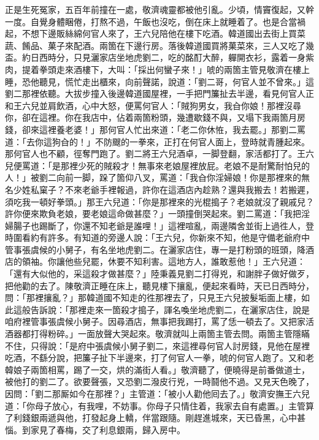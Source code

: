 正是生死冤家，五百年前撞在一處，敬濟魂靈都被他引亂。少頃，情竇復起，又幹一度。自覺身體睏倦，打熬不過，午飯也沒吃，倒在床上就睡着了。也是合當禍起，不想下邊販絲綿何官人來了，王六兒陪他在樓下吃酒。韓道國出去街上買菜蔬、餚品、菓子來配酒。兩箇在下邊行房。落後韓道國買將菓菜來，三人又吃了幾盃。約日西時分，只見灑家店坐地虎劉二，吃的酩酊大醉，軃開衣衫，露着一身紫肉，提着拳頭走來酒樓下，大叫：「採出何蠻子來！」唬的兩箇主管見敬濟在樓上睡，恐他聽見，慌忙走出櫃來，向前聲諾，說道：「劉二哥，何官人並不曾來。」這劉二那裡依聽。大拔步撞入後邊韓道國屋裡，一手把門簾扯去半邊，看見何官人正和王六兒並肩飲酒，心中大怒，便罵何官人：「賊狗男女，我㒲你娘！那裡沒尋你，卻在這裡。你在我店中，佔着兩箇粉頭，幾遭歇錢不與，又塌下我兩箇月房錢，卻來這裡養老婆！」{}那何官人忙出來道：「老二你休恠，我去罷。」那劉二罵道：「去你這狗㒲的！」不防颼的一拳來，正打在何官人面上，登時就青腫起來。那何官人也不顧，徑奪門跑了。劉二將王六兒酒卓，一脚登翻，家活都打了。王六兒便罵道：「是那裡少死的賊殺才！無事來老娘屋裡放屁。老娘不是耐驚耐怕兒的人！」{}被劉二向前一脚，跺了箇仰八叉，罵道：「我㒲你淫婦娘！你是那裡來的無名少姓私窠子？不來老爺手裡報過，許你在這酒店內趁熟？還與我搬去！若搬遲，須吃我一頓好拳頭。」那王六兒道：「你是那裡來的光棍搗子？老娘就沒了親戚兒？許你便來欺負老娘，要老娘這命做甚麼？」一頭撞倒哭起來。劉二罵道：「我把淫婦腸子也踢斷了，你還不知老爺是誰哩！」這裡喧亂，兩邊隣舍並街上過徃人，登時圍看約有許多。有知道的旁邊人說：「王六兒，你新來不知，他是守備老爺府中管事張虞候的小舅子，有名坐地虎劉二。在灑家店住，專一是打粉頭的班頭，降酒店的領袖。你讓他些兒罷，休要不知利害。這地方人，誰敢惹他！」王六兒道：「還有大似他的，采這殺才做甚麼？」陸秉義見劉二打得兇，和謝胖子做好做歹，把他勸的去了。陳敬濟正睡在床上，聽見樓下攘亂，便起來看時，天已日西時分，問：「那裡攘亂？」那韓道國不知走的徃那裡去了，只見王六兒披髮垢面上樓，如此這般告訴說：「那裡走來一箇殺才搗子，諢名喚坐地虎劉二，在灑家店住，說是咱府裡管事張虞候小舅子。因尋酒店，無事把我踢打，罵了恁一頓去了。又把家活酒器都打得粉碎。」一面放聲大哭起來。敬濟就叫上兩箇主管去問。兩箇主管隱瞞不住，只得說：「是府中張虞候小舅子劉二，來這裡尋何官人討房錢，見他在屋裡吃酒，不繇分說，把簾子扯下半邊來，打了何官人一拳，唬的何官人跑了。又和老韓娘子兩箇相罵，踢了一交，烘的滿街人看。」敬濟聽了，便曉得是前番做道士，被他打的劉二了。欲要聲張，又恐劉二潑皮行兇，一時鬪他不過。又見天色晚了，因問：「劉二那厮如今在那裡？」主管道：「被小人勸他囘去了。」敬濟安撫王六兒道：「你母子放心，有我哩，不妨事。你母子只情住着，我家去自有處置。」主管算了利錢銀兩遞與他，打發起身上轎，伴當跟隨。剛趕進城來，天已昏黑，心中甚惱。到家見了春梅，交了利息銀兩，歸入房中。

